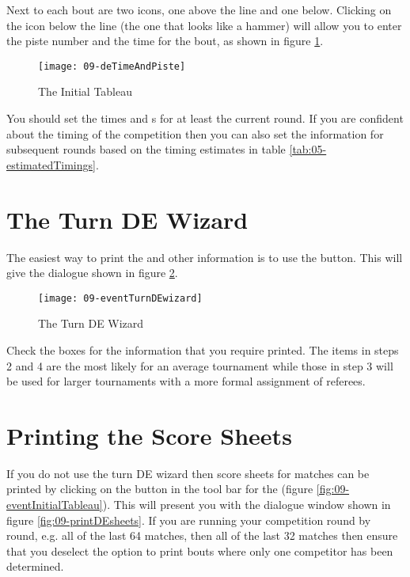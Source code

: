\documentclass[a4paper,11pt]{memoir}
\begin{document}
Next to each bout are two icons, one above the line and one below. Clicking on the icon below the line (the one that looks like a hammer) will allow you to enter the piste number and the time for the bout, as shown in figure \ref{fig:09-deTimeAndPiste}.

\begin{figure}[!ht]
 \centering
 \texttt{[image: 09-deTimeAndPiste]}
 \caption{The Initial Tableau} \label{fig:09-deTimeAndPiste}
\end{figure}

You should set the times and s for at least the current round. If you are confident about the timing of the competition then you can also set the information for subsequent rounds based on the timing estimates in table \ref{tab:05-estimatedTimings}.

\section{The Turn DE Wizard}

The easiest way to print the  and other information is to use the  button. This will give the dialogue shown in figure \ref{fig:09-eventTurnDEwizard}.

\begin{figure}[!ht]
 \centering
 \texttt{[image: 09-eventTurnDEwizard]}
 \caption{The Turn DE Wizard} \label{fig:09-eventTurnDEwizard}
\end{figure}

Check the boxes for the information that you require printed. The items in steps 2 and 4 are the most likely for an average tournament while those in step 3 will be used for larger tournaments with a more formal assignment of referees.

\section{Printing the Score Sheets}

If you do not use the turn DE wizard then score sheets for matches can be printed by clicking on the  button in the tool bar for the  (figure \ref{fig:09-eventInitialTableau}). This will present you with the dialogue window shown in figure \ref{fig:09-printDEsheets}. If you are running your competition round by round, e.g. all of the last 64 matches, then all of the last 32 matches then ensure that you deselect the option to print bouts where only one competitor has been determined. 
\end{document}
